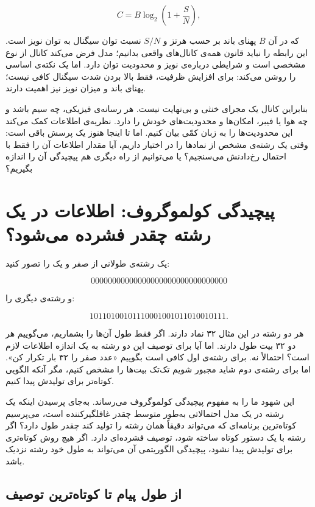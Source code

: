 \[
C=B\log_2\left(1+\frac{S}{N}\right),
\]

که در آن \(B\) پهنای باند بر حسب هرتز و \(S/N\) نسبت توان سیگنال به توان نویز است. این رابطه را نباید قانون همه‌ی کانال‌های واقعی بدانیم؛ مدل فرض می‌کند کانال از نوع مشخصی است و شرایطی درباره‌ی نویز و محدودیت توان دارد. اما یک نکته‌ی اساسی را روشن می‌کند: برای افزایش ظرفیت، فقط بالا بردن شدت سیگنال کافی نیست؛ پهنای باند و میزان نویز نیز اهمیت دارند. \autocite{shannon1949noise,cover2006}

بنابراین کانال یک مجرای خنثی و بی‌نهایت نیست. هر رسانه‌ی فیزیکی، چه سیم باشد و چه هوا یا فیبر، امکان‌ها و محدودیت‌های خودش را دارد. نظریه‌ی اطلاعات کمک می‌کند این محدودیت‌ها را به زبان کمّی بیان کنیم. اما تا اینجا هنوز یک پرسش باقی است: وقتی یک رشته‌ی مشخص از نمادها را در اختیار داریم، آیا مقدار اطلاعات آن را فقط با احتمال رخ‌دادنش می‌سنجیم؟ یا می‌توانیم از راه دیگری هم پیچیدگی آن را اندازه بگیریم؟

\section{پیچیدگی کولموگروف: اطلاعات در یک رشته چقدر فشرده می‌شود؟}
\label{sec:kolmogorov-complexity}

یک رشته‌ی طولانی از صفر و یک را تصور کنید:

\[
00000000000000000000000000000000
\]

و رشته‌ی دیگری را:

\[
10110100101110001001011010010111.
\]

هر دو رشته در این مثال ۳۲ نماد دارند. اگر فقط طول آن‌ها را بشماریم، می‌گوییم هر دو ۳۲ بیت طول دارند. اما آیا برای توصیف این دو رشته به یک اندازه اطلاعات لازم است؟ احتمالاً نه. برای رشته‌ی اول کافی است بگوییم «عدد صفر را ۳۲ بار تکرار کن». اما برای رشته‌ی دوم شاید مجبور شویم تک‌تک بیت‌ها را مشخص کنیم، مگر آنکه الگویی کوتاه‌تر برای تولیدش پیدا کنیم.

این شهود ما را به مفهوم پیچیدگی کولموگروف می‌رساند. به‌جای پرسیدن اینکه یک رشته در یک مدل احتمالاتی به‌طور متوسط چقدر غافلگیرکننده است، می‌پرسیم کوتاه‌ترین برنامه‌ای که می‌تواند دقیقاً همان رشته را تولید کند چقدر طول دارد؟ اگر رشته با یک دستور کوتاه ساخته شود، توصیف فشرده‌ای دارد. اگر هیچ روش کوتاه‌تری برای تولیدش پیدا نشود، پیچیدگی الگوریتمی آن می‌تواند به طول خود رشته نزدیک باشد. \autocite{kolmogorov1965,livitanyi2008}

\subsection{از طول پیام تا کوتاه‌ترین توصیف}
\label{sub:shortest-description}

